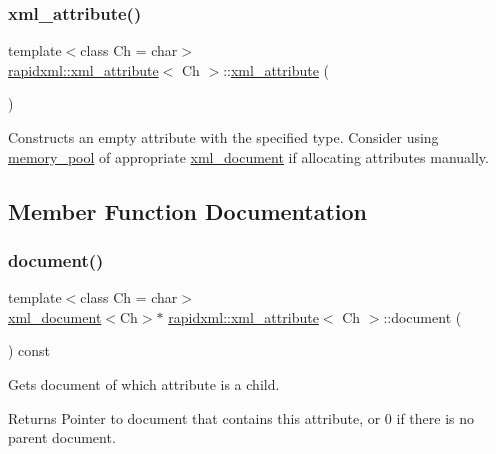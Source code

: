 \subsubsection{\texorpdfstring{xml\+\_\+attribute()}{xml\_attribute()}}
{\footnotesize\ttfamily template$<$class Ch = char$>$ \\
\mbox{\hyperlink{classrapidxml_1_1xml__attribute}{rapidxml\+::xml\+\_\+attribute}}$<$ Ch $>$\+::\mbox{\hyperlink{classrapidxml_1_1xml__attribute}{xml\+\_\+attribute}} (\begin{DoxyParamCaption}{ }\end{DoxyParamCaption})\hspace{0.3cm}{\ttfamily [inline]}}

Constructs an empty attribute with the specified type. Consider using \mbox{\hyperlink{classrapidxml_1_1memory__pool}{memory\+\_\+pool}} of appropriate \mbox{\hyperlink{classrapidxml_1_1xml__document}{xml\+\_\+document}} if allocating attributes manually. 

\subsection{Member Function Documentation}
\mbox{\label{classrapidxml_1_1xml__attribute_ab0ff3bc7880a6969ddcf0bb1e0444077}} 
\subsubsection{\texorpdfstring{document()}{document()}}
{\footnotesize\ttfamily template$<$class Ch = char$>$ \\
\mbox{\hyperlink{classrapidxml_1_1xml__document}{xml\+\_\+document}}$<$Ch$>$$\ast$ \mbox{\hyperlink{classrapidxml_1_1xml__attribute}{rapidxml\+::xml\+\_\+attribute}}$<$ Ch $>$\+::document (\begin{DoxyParamCaption}{ }\end{DoxyParamCaption}) const\hspace{0.3cm}{\ttfamily [inline]}}

Gets document of which attribute is a child. \begin{DoxyReturn}{Returns}
Pointer to document that contains this attribute, or 0 if there is no parent document. 
\end{DoxyReturn}
\mbox{\label{classrapidxml_1_1xml__attribute_affd0c8d0a9020df0998c507cae5474e5}} 
